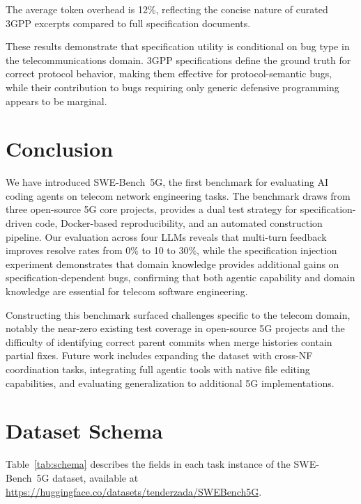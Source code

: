 \documentclass[10pt,conference]{IEEEtran}
\begin{document}
The average token overhead is 12\%, reflecting the concise nature of curated 3GPP excerpts compared to full specification documents.

These results demonstrate that specification utility is conditional on bug type in the telecommunications domain. 3GPP specifications define the ground truth for correct protocol behavior, making them effective for protocol-semantic bugs, while their contribution to bugs requiring only generic defensive programming appears to be marginal.

\section{Conclusion}

We have introduced SWE-Bench~5G, the first benchmark for evaluating AI coding agents on telecom network engineering tasks. The benchmark draws from three open-source 5G core projects, provides a dual test strategy for specification-driven code, Docker-based reproducibility, and an automated construction pipeline. Our evaluation across four LLMs reveals that multi-turn feedback improves resolve rates from 0\% to 10 to 30\%, while the specification injection experiment demonstrates that domain knowledge provides additional gains on specification-dependent bugs, confirming that both agentic capability and domain knowledge are essential for telecom software engineering.

Constructing this benchmark surfaced challenges specific to the telecom domain, notably the near-zero existing test coverage in open-source 5G projects and the difficulty of identifying correct parent commits when merge histories contain partial fixes. Future work includes expanding the dataset with cross-NF coordination tasks, integrating full agentic tools with native file editing capabilities, and evaluating generalization to additional 5G implementations.




\appendices

\section{Dataset Schema}

Table~\ref{tab:schema} describes the fields in each task instance of the SWE-Bench~5G dataset, available at \url{https://huggingface.co/datasets/tenderzada/SWEBench5G}.
\end{document}
